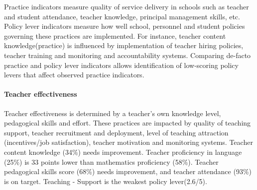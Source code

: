 \documentclass[
  twocolumn]{article}
\begin{document}
Practice indicators measure quality of service delivery in schools such
as teacher and student attendance, teacher knowledge, principal
management skills, etc. Policy lever indicators measure how well school,
personnel and student policies governing these practices are
implemented. For instance, teacher content knowledge(practice) is
influenced by implementation of teacher hiring policies, teacher
training and monitoring and accountability systems. Comparing de-facto
practice and policy lever indicators allows identification of
low-scoring policy levers that affect observed practice indicators.

\hypertarget{teacher-effectiveness}{%
\paragraph{\texorpdfstring{\textbf{Teacher
effectiveness}}{Teacher effectiveness}}\label{teacher-effectiveness}}

Teacher effectiveness is determined by a teacher's own knowledge level,
pedagogical skills and effort. These practices are impacted by quality
of teaching support, teacher recruitment and deployment, level of
teaching attraction (incentives/job satisfaction), teacher motivation
and monitoring systems. Teacher content knowledge (34\%) needs
improvement. Teacher proficiency in language (25\%) is 33 points lower
than mathematics proficiency (58\%). Teacher pedagogical skills score
(68\%) needs improvement, and teacher attendance (93\%) is on target.
Teaching - Support is the weakest policy lever(2.6/5).
\end{document}

